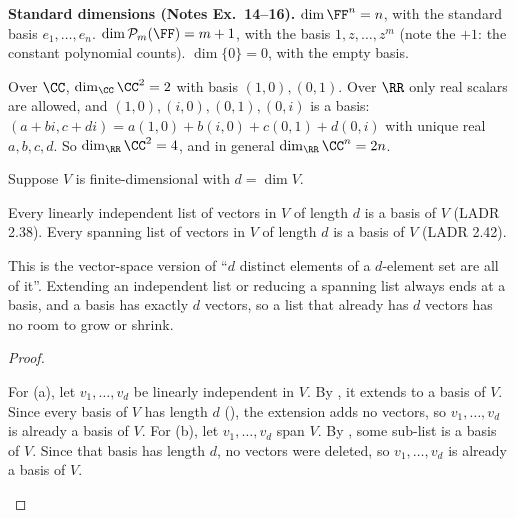 \documentclass[10pt]{scrartcl}
\newcommand{\PP}{\mathcal P}
\begin{document}
\textbf{Standard dimensions (Notes Ex.~14--16).} $\dim\FF^n=n$, with the standard basis $e_1,\dots,e_n$. $\dim\PP_m(\FF)=m+1$, with the basis $1,z,\dots,z^m$ (note the $+1$: the constant polynomial counts). $\dim\{0\}=0$, with the empty basis.

\begin{example*}
  Over $\CC$, $\dim_\CC\CC^2=2$ with basis $(1,0),(0,1)$. Over $\RR$ only real scalars are allowed, and $(1,0),(i,0),(0,1),(0,i)$ is a basis: $(a+bi,c+di)=a(1,0)+b(i,0)+c(0,1)+d(0,i)$ with unique real $a,b,c,d$. So $\dim_\RR\CC^2=4$, and in general $\dim_\RR\CC^n=2n$.
\end{example*}

\begin{proposition*}
  Suppose $V$ is finite-dimensional with $d=\dim V$.
  \begin{enumerate}[(a)]
    \ii Every linearly independent list of vectors in $V$ of length $d$ is a basis of $V$ (LADR 2.38).
    \ii Every spanning list of vectors in $V$ of length $d$ is a basis of $V$ (LADR 2.42).
  \end{enumerate}
\end{proposition*}
\begin{ideabox}
  This is the vector-space version of ``$d$ distinct elements of a $d$-element set are all of it''. Extending an independent list or reducing a spanning list always ends at a basis, and a basis has exactly $d$ vectors, so a list that already has $d$ vectors has no room to grow or shrink.
\end{ideabox}
\begin{proof}
  \begin{steps}
    \ii For (a), let $v_1,\dots,v_d$ be linearly independent in $V$. By , it extends to a basis of $V$. Since every basis of $V$ has length $d$ (), the extension adds no vectors, so $v_1,\dots,v_d$ is already a basis of $V$.
    \ii For (b), let $v_1,\dots,v_d$ span $V$. By , some sub-list is a basis of $V$. Since that basis has length $d$, no vectors were deleted, so $v_1,\dots,v_d$ is already a basis of $V$.
  \end{steps}
\end{proof}
\end{document}
